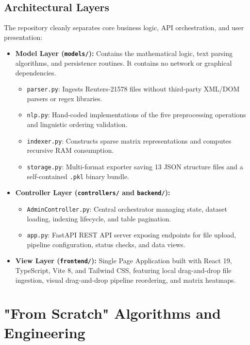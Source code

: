 \documentclass[11pt,a4paper]{article}
\begin{document}
\subsection{Architectural Layers}
The repository cleanly separates core business logic, API orchestration, and user presentation:
\begin{itemize}
    \item \textbf{Model Layer (\texttt{models/}):} Contains the mathematical logic, text parsing algorithms, and persistence routines. It contains no network or graphical dependencies.
    \begin{itemize}
        \item \texttt{parser.py}: Ingests Reuters-21578 files without third-party XML/DOM parsers or regex libraries.
        \item \texttt{nlp.py}: Hand-coded implementations of the five preprocessing operations and linguistic ordering validation.
        \item \texttt{indexer.py}: Constructs sparse matrix representations and computes recursive RAM consumption.
        \item \texttt{storage.py}: Multi-format exporter saving 13 JSON structure files and a self-contained \texttt{.pkl} binary bundle.
    \end{itemize}
    \item \textbf{Controller Layer (\texttt{controllers/} and \texttt{backend/}):}
    \begin{itemize}
        \item \texttt{AdminController.py}: Central orchestrator managing state, dataset loading, indexing lifecycle, and table pagination.
        \item \texttt{app.py}: FastAPI REST API server exposing endpoints for file upload, pipeline configuration, status checks, and data views.
    \end{itemize}
    \item \textbf{View Layer (\texttt{frontend/}):} Single Page Application built with React 19, TypeScript, Vite 8, and Tailwind CSS, featuring local drag-and-drop file ingestion, visual drag-and-drop pipeline reordering, and matrix heatmaps.
\end{itemize}

\section{"From Scratch" Algorithms and Engineering}
\end{document}
